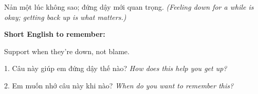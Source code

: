 \begin{baihoc}
Nản một lúc không sao; đứng dậy mới quan trọng.
\textit{(Feeling down for a while is okay; getting back up is what matters.)}
\end{baihoc}

\begin{ghinhoanh}
\textbf{Short English to remember:}

Support when they're down, not blame.

\end{ghinhoanh}

\begin{tuhocnhanh}
1. Câu này giúp em đứng dậy thế nào? \textit{How does this help you get up?}

2. Em muốn nhớ câu này khi nào? \textit{When do you want to remember this?}
\end{tuhocnhanh}
\ngancach
